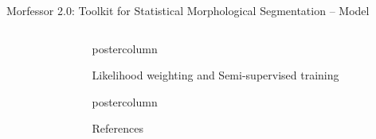 \documentclass[final]{beamer} %
\begin{document}
\begin{frame}{Morfessor 2.0: Toolkit for Statistical Morphological Segmentation -- Model}
\begin{columns}
\begin{column}{.3\textwidth}
\end{column}
\begin{column}{.3\textwidth}


      \begin{beamercolorbox}[center,wd=\textwidth]{postercolumn}
 \begin{block}{Likelihood weighting and Semi-supervised training }


            \end{block}
	\end{beamercolorbox}


  \begin{beamercolorbox}[center,wd=\textwidth]{postercolumn}
 \begin{block}{References}
\footnotesize

           
            \end{block}
            
	\end{beamercolorbox}




\end{column}

\end{columns}
 \end{frame}



  
\end{document}

